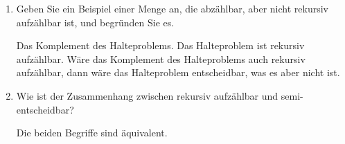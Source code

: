 \documentclass{lehramt-informatik-aufgabe}
\begin{document}
\begin{enumerate}

\item Geben Sie ein Beispiel einer Menge an, die abzählbar, aber nicht
rekursiv aufzählbar ist, und begründen Sie es.

\begin{liAntwort}
Das Komplement des Halteproblems. Das Halteproblem ist rekursiv
aufzählbar. Wäre das Komplement des Halteproblems auch rekursiv
aufzählbar, dann wäre das Halteproblem entscheidbar, was es aber nicht
ist.
\end{liAntwort}


\item Wie ist der Zusammenhang zwischen rekursiv aufzählbar und
semi-entscheidbar?

\begin{liAntwort}
Die beiden Begriffe sind äquivalent.
\end{liAntwort}

\end{enumerate}
\end{document}
